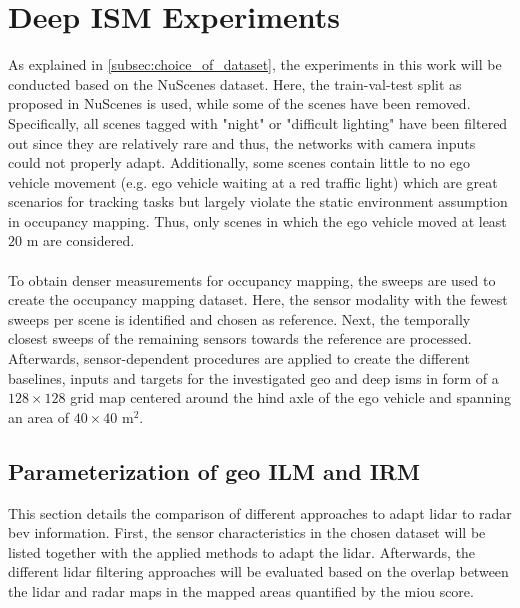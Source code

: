 \chapter{Deep ISM Experiments}
\label{ch:deep_ism_exp}
As explained in \ref{subsec:choice_of_dataset}, the experiments in this work will be conducted based on the NuScenes dataset. Here, the train-val-test split as proposed in NuScenes is used, while some of the scenes have been removed. Specifically, all scenes tagged with "night" or "difficult lighting" have been filtered out since they are relatively rare and thus, the networks with camera inputs could not properly adapt. Additionally, some scenes contain little to no ego vehicle movement (e.g. ego vehicle waiting at a red traffic light) which are great scenarios for tracking tasks but largely violate the static environment assumption in occupancy mapping. Thus, only scenes in which the ego vehicle moved at least $20$ m are considered.
\\\\
To obtain denser measurements for occupancy mapping, the sweeps are used to create the occupancy mapping dataset. Here, the sensor modality with the fewest sweeps per scene is identified and chosen as reference. Next, the temporally closest sweeps of the remaining sensors towards the reference are processed. Afterwards, sensor-dependent procedures are applied to create the different baselines, inputs and targets for the investigated geo and deep \gls{ism}s in form of a $128 \times 128$ grid map centered around the hind axle of the ego vehicle and spanning an area of $40 \times 40$ m$^2$.
%
\section{Parameterization of geo ILM and IRM}
\label{sec:choice_of_gt}
This section details the comparison of different approaches to adapt lidar to radar \gls{bev} information. First, the sensor characteristics in the chosen dataset will be listed together with the applied methods to adapt the lidar. Afterwards, the different lidar filtering approaches will be evaluated based on the overlap between the lidar and radar maps in the mapped areas quantified by the m\gls{iou} score. 
%
